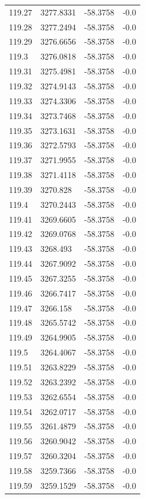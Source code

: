 \begin{table}[H]
\begin{tabular}{llll}
119.27 & 3277.8331 & -58.3758 & -0.0 \\
119.28 & 3277.2494 & -58.3758 & -0.0 \\
119.29 & 3276.6656 & -58.3758 & -0.0 \\
119.3 & 3276.0818 & -58.3758 & -0.0 \\
119.31 & 3275.4981 & -58.3758 & -0.0 \\
119.32 & 3274.9143 & -58.3758 & -0.0 \\
119.33 & 3274.3306 & -58.3758 & -0.0 \\
119.34 & 3273.7468 & -58.3758 & -0.0 \\
119.35 & 3273.1631 & -58.3758 & -0.0 \\
119.36 & 3272.5793 & -58.3758 & -0.0 \\
119.37 & 3271.9955 & -58.3758 & -0.0 \\
119.38 & 3271.4118 & -58.3758 & -0.0 \\
119.39 & 3270.828 & -58.3758 & -0.0 \\
119.4 & 3270.2443 & -58.3758 & -0.0 \\
119.41 & 3269.6605 & -58.3758 & -0.0 \\
119.42 & 3269.0768 & -58.3758 & -0.0 \\
119.43 & 3268.493 & -58.3758 & -0.0 \\
119.44 & 3267.9092 & -58.3758 & -0.0 \\
119.45 & 3267.3255 & -58.3758 & -0.0 \\
119.46 & 3266.7417 & -58.3758 & -0.0 \\
119.47 & 3266.158 & -58.3758 & -0.0 \\
119.48 & 3265.5742 & -58.3758 & -0.0 \\
119.49 & 3264.9905 & -58.3758 & -0.0 \\
119.5 & 3264.4067 & -58.3758 & -0.0 \\
119.51 & 3263.8229 & -58.3758 & -0.0 \\
119.52 & 3263.2392 & -58.3758 & -0.0 \\
119.53 & 3262.6554 & -58.3758 & -0.0 \\
119.54 & 3262.0717 & -58.3758 & -0.0 \\
119.55 & 3261.4879 & -58.3758 & -0.0 \\
119.56 & 3260.9042 & -58.3758 & -0.0 \\
119.57 & 3260.3204 & -58.3758 & -0.0 \\
119.58 & 3259.7366 & -58.3758 & -0.0 \\
119.59 & 3259.1529 & -58.3758 & -0.0 \\

\end{tabular}
\end{table}
